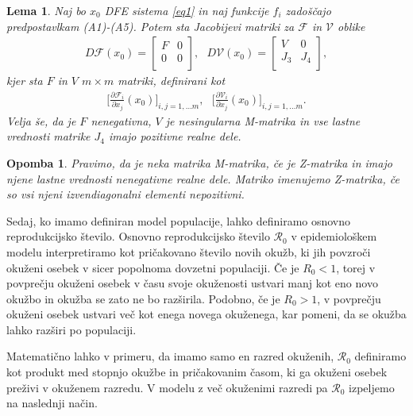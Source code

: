 \documentclass[a4paper,12pt]{article}
\newcommand{\R}{\mathcal R}
\newcommand{\F}{\mathcal F}
\newcommand{\V}{\mathcal V}
\newtheorem{lema}{Lema}
\newtheorem{opomba}{Opomba}
\begin{document}
\begin{lema} \label{lema1}
    Naj bo \(x_0\) DFE sistema \ref{eq1} in naj funkcije \(f_i\) zadoščajo predpostavlkam
    (A1)-(A5). Potem sta Jacobijevi matriki za \(\F\) in \(\V\) oblike
    \begin{align*}
        D\F(x_0)= 
        \begin{bmatrix}
        F & 0 \\
        0 & 0 \\
        \end{bmatrix},\textrm{ }
        D\V(x_0)=
        \begin{bmatrix}
        V & 0 \\
        J_3 & J_4 \\
        \end{bmatrix},
    \end{align*}
    kjer sta \(F\) in \(V\) \(m\times m\) matriki, definirani kot
    \begin{align*}
        \big[\frac{\partial \F_i}{\partial x_j}(x_0)\big]_{i,j=1,\ldots m},\textrm{ }
        \big[\frac{\partial \V_i}{\partial x_j}(x_0)\big]_{i,j=1,\ldots m}.
    \end{align*}
    Velja še, da je \(F\) nenegativna, \(V\) je nesingularna M-matrika in vse lastne
    vrednosti matrike \(J_4\) imajo pozitivne realne dele.
\end{lema}

\begin{opomba}
    Pravimo, da je neka matrika M-matrika, če je Z-matrika in imajo njene lastne
    vrednosti nenegativne realne dele. Matriko imenujemo Z-matrika, če so vsi njeni
    izvendiagonalni elementi nepozitivni.
\end{opomba}

Sedaj, ko imamo definiran model populacije, lahko definiramo osnovno reprodukcijsko
število. Osnovno reprodukcijsko število \(\R_0\) v epidemiološkem modelu interpretiramo
kot pričakovano število novih okužb, ki jih povzroči okuženi osebek v sicer popolnoma
dovzetni populaciji. Če je \(R_0<1\), torej v povprečju okuženi osebek v času svoje
okuženosti ustvari manj kot eno novo okužbo in okužba se zato ne bo razširila. Podobno, če je 
\(R_0>1\), v povprečju okuženi osebek ustvari več kot enega novega okuženega, kar pomeni,
da se okužba lahko razširi po populaciji. 

Matematično lahko v primeru, da imamo samo en razred okuženih, \(\R_0\) definiramo
kot produkt med stopnjo okužbe in pričakovanim časom, ki ga okuženi osebek preživi 
v okuženem razredu. V modelu z več okuženimi razredi pa \(\R_0\) izpeljemo na naslednji način.
\end{document}
